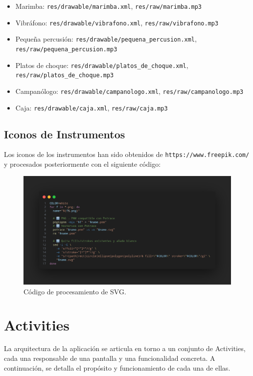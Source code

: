 \documentclass{article}
\newcommand{\instrumentopath}{/home/khz/Documentos/Carrera/MusiKe/instrumentos/svg/}
\newcommand{\instrumento}[1]{\raisebox{-0.6em}{}}
\begin{document}
\begin{itemize}
  \item \instrumento{marimba} Marimba: \texttt{res/drawable/marimba.xml}, \texttt{res/raw/marimba.mp3}
  \item \instrumento{vibrafono} Vibráfono: \texttt{res/drawable/vibrafono.xml}, \texttt{res/raw/vibrafono.mp3}
  \item \instrumento{pequena_percusion} Pequeña percusión: \texttt{res/drawable/pequena\_percusion.xml}, \texttt{res/raw/pequena\_percusion.mp3}
  \item \instrumento{platos_de_choque} Platos de choque: \texttt{res/drawable/platos\_de\_choque.xml}, \texttt{res/raw/platos\_de\_choque.mp3}
  \item \instrumento{campanologo} Campanólogo: \texttt{res/drawable/campanologo.xml}, \texttt{res/raw/campanologo.mp3}
  \item \instrumento{caja} Caja: \texttt{res/drawable/caja.xml}, \texttt{res/raw/caja.mp3}
\end{itemize}
\newpage
\subsection{Iconos de Instrumentos}

Los iconos de los instrumentos han sido obtenidos de \texttt{https://www.freepik.com/} y procesados posteriormente con el siguiente código:

\begin{figure}[h]
\centering
\includegraphics[width=\textwidth]{svg_codigo.png}
\caption{Código de procesamiento de SVG.}
\end{figure}


\section{Activities}

La arquitectura de la aplicación se articula en torno a un conjunto de Activities, cada una responsable de una pantalla y una funcionalidad concreta. A continuación, se detalla el propósito y funcionamiento de cada una de ellas.
\end{document}

